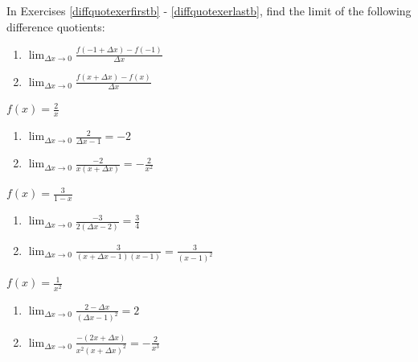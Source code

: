 \documentclass{ximera}
\begin{document}
\begin{question}
In Exercises \ref{diffquotexerfirstb} - \ref{diffquotexerlastb}, find the limit of the following difference quotients:


\begin{enumerate}

\item  $\lim_{\Delta x \rightarrow 0} \frac{f(-1+\Delta x) - f(-1)}{\Delta x}$

\item  $\lim_{\Delta x \rightarrow 0} \frac{f(x+\Delta x) - f(x)}{\Delta x}$

\end{enumerate}


\begin{problem} \label{diffquotexerfirstb}
$f(x) = \frac{2}{x}$ 

\begin{solution}
\begin{enumerate}
\item $\lim_{\Delta x \rightarrow 0} \frac{2}{\Delta x-1} = -2$

\item $\lim_{\Delta x \rightarrow 0} \frac{-2}{x(x+\Delta x)} = - \frac{2}{x^2}$
\end{enumerate}
\end{solution}
\end{problem}

\begin{problem}
$f(x) = \frac{3}{1-x}$

\begin{solution}
\begin{enumerate}
\item $\lim_{\Delta x \rightarrow 0} \frac{-3}{2(\Delta x - 2)} = \frac{3}{4}$

\item $\lim_{\Delta x \rightarrow 0} \frac{3}{(x+\Delta x-1)(x-1)} =  \frac{3}{(x-1)^2}$
\end{enumerate}
\end{solution}
\end{problem}

\begin{problem}
$f(x) = \frac{1}{x^2}$

\begin{solution}
\begin{enumerate}
\item $\lim_{\Delta x \rightarrow 0} \frac{2-\Delta x}{(\Delta x - 1)^2} =2$

\item $\lim_{\Delta x \rightarrow 0}\frac{-(2x+\Delta x)}{x^2(x+\Delta x)^2} =  - \frac{2}{x^3}$ 
\end{enumerate}
\end{solution}
\end{problem}


\end{question}
\end{document}
